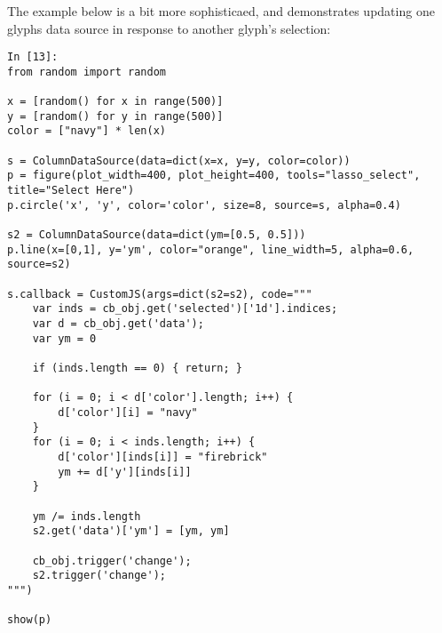 \documentclass[a4paper,12pt]{article}
\begin{document}
The example below is a bit more sophisticaed, and demonstrates updating one glyphs data source in response to another glyph's selection:
\begin{framed}
\begin{verbatim}
In [13]:
from random import random

x = [random() for x in range(500)]
y = [random() for y in range(500)]
color = ["navy"] * len(x)

s = ColumnDataSource(data=dict(x=x, y=y, color=color))
p = figure(plot_width=400, plot_height=400, tools="lasso_select", title="Select Here")
p.circle('x', 'y', color='color', size=8, source=s, alpha=0.4)

s2 = ColumnDataSource(data=dict(ym=[0.5, 0.5]))
p.line(x=[0,1], y='ym', color="orange", line_width=5, alpha=0.6, source=s2)

s.callback = CustomJS(args=dict(s2=s2), code="""
    var inds = cb_obj.get('selected')['1d'].indices;
    var d = cb_obj.get('data');
    var ym = 0
    
    if (inds.length == 0) { return; }
    
    for (i = 0; i < d['color'].length; i++) {
        d['color'][i] = "navy"
    }
    for (i = 0; i < inds.length; i++) {
        d['color'][inds[i]] = "firebrick"
        ym += d['y'][inds[i]]
    }
    
    ym /= inds.length
    s2.get('data')['ym'] = [ym, ym]
    
    cb_obj.trigger('change');
    s2.trigger('change');
""")

show(p)
	
\end{verbatim}
\end{framed}
 
 
 
\end{document}
